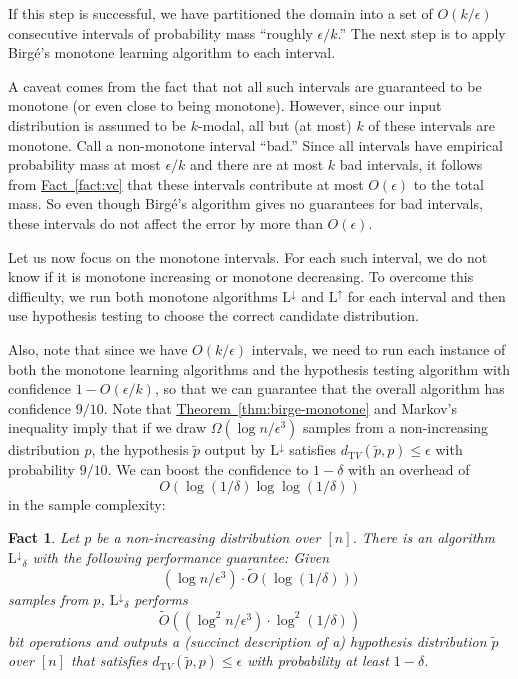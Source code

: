 \documentclass[10pt]{article}
\newtheorem{fact}[theorem]{Fact}
\theoremstyle{definition}
\numberwithin{equation}{section}
\newcommand{\expref}[2]{\texorpdfstring{\hyperref[#2]{#1~\ref{#2}}}{#1~\ref{#2}}}
\newcommand{\dtv}{d_{\mathrm TV}}
\newcommand{\eps}{\epsilon}
\newcommand{\AND}{{\mathrm{L^{\uparrow}}}}
\newcommand{\ANI}{{\mathrm{L^{\downarrow}}}}
\begin{document}
If this step is successful, we have partitioned the domain into a set of $O(k/\eps)$ consecutive intervals
of probability mass ``roughly $\eps/k$.'' {The} next step is to apply Birg{\'e}'s monotone learning algorithm
to each interval.

A caveat comes from the fact that not all such intervals are guaranteed to be
monotone (or even close to being monotone). However, since our input distribution is assumed to be $k$-modal,
all but (at most) $k$ of these intervals are monotone. Call a non-monotone interval ``bad.'' Since all intervals
have {empirical} probability mass at most $\eps / k$ and there are at most $k$ bad intervals, it follows from \expref{Fact}{fact:vc} that 
these intervals contribute at most {$O(\eps)$} to the total mass. So
even though Birg{\'e}'s algorithm gives no guarantees for bad intervals,
these intervals do not affect the error by more than {$O(\eps)$}.

Let us now focus on the  monotone intervals. For each such interval, we do not
know if it is monotone increasing or monotone decreasing. To overcome this
difficulty, we run both monotone algorithms $\ANI$ and $\AND$
for each interval and then use
hypothesis testing to choose the correct candidate distribution.

Also, note that since we have ${O(k/\eps)}$ intervals, we need to run each instance of both
the monotone learning algorithms and the hypothesis testing algorithm with
confidence $1-O(\eps/k)$, so that we can guarantee that the
overall algorithm has confidence $9/10$. Note that
\expref{Theorem}{thm:birge-monotone} and Markov's inequality imply that if we
draw $\Omega(\log n / \eps^3)$ samples from a non-increasing distribution $p$,
the hypothesis $\widetilde{p}$ output by $\ANI$ satisfies
$\dtv(\widetilde{p},p) \leq \eps$ with probability $9/10$. We can boost the
confidence to $1-\delta$ with an overhead of
\[
O(\log(1/\delta) \log\log(1/\delta))
\]
in the sample complexity:

%


\begin{fact} \label{fact:birge-tournament}
Let $p$ be a non-increasing distribution over $[n]$.
There is an algorithm $\ANI_{\delta}$ with the following performance guarantee:
Given
\[
(\log n /\eps^3) \cdot \tilde{O}(\log(1/\delta)))
\]
samples from $p$, $\ANI_{\delta}$ performs
\[
\tilde{O}\left( (\log^2 n / \eps^3)\cdot \log^{2}(1/\delta) \right)
\]
bit operations
and outputs a (succinct description of a) hypothesis distribution $\widetilde{p}$ over $[n]$
that satisfies $\dtv(\widetilde{p}, p) \leq \eps$ with probability at least $1-\delta$.
\end{fact}
\end{document}
